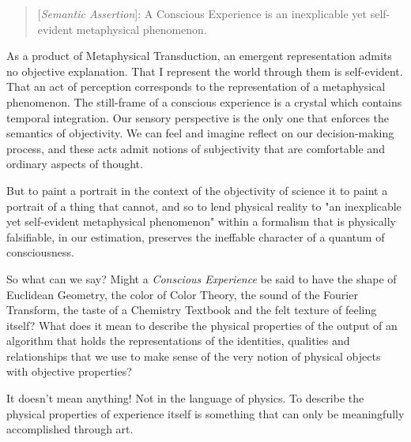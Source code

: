 \documentclass[runningheads]{llncs}
\begin{document}
\begin{quote}
[\emph{Semantic Assertion}]: A Conscious Experience is an inexplicable yet self-evident metaphysical phenomenon.
\end{quote}

As a product of Metaphysical Transduction, an emergent representation admits no objective explanation. That I represent the world through them is self-evident. That an act of perception corresponds to the representation of a metaphysical phenomenon. The still-frame of a conscious experience is a crystal which contains temporal integration. Our sensory perspective is the only one that enforces the semantics of objectivity. We can feel and imagine reflect on our decision-making process, and these acts admit notions of subjectivity that are comfortable and ordinary aspects of thought.

But to paint a portrait in the context of the objectivity of science it to paint a portrait of a thing that cannot, and so to lend physical reality to "an inexplicable yet self-evident metaphysical phenomenon" within a formalism that is physically falsifiable, in our estimation, preserves the ineffable character of a quantum of consciousness.

So what can we say? Might a \emph{Conscious Experience} be said to have the shape of Euclidean Geometry, the color of Color Theory, the sound of the Fourier Transform, the taste of a Chemistry Textbook and the felt texture of feeling itself? What does it mean to describe the physical properties of the output of an algorithm that holds the representations of the identities, qualities and relationships that we use to make sense of the very notion of physical objects with objective properties?

It doesn't mean anything! Not in the language of physics. To describe the physical properties of experience itself is something that can only be meaningfully accomplished through art\cite{Hofstadter1979}.

\end{document}
